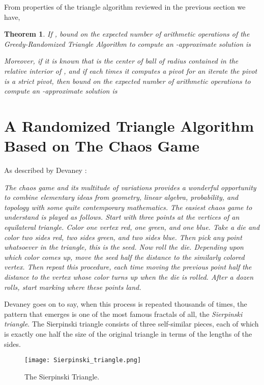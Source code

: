 \documentclass{article}
\newtheorem{thm}{Theorem}
\theoremstyle{definition}
\begin{document}
From properties of the triangle algorithm  reviewed  in the previous section we have,

\begin{thm} If , bound on the expected number of arithmetic operations of the Greedy-Randomized Triangle Algorithm to compute an -approximate solution is

Moreover, if it is known that  is the center of ball of radius  contained in the relative interior of , and if each times it computes a pivot for an iterate the pivot is a strict pivot, then bound on the expected number of arithmetic operations to compute an -approximate solution is

\end{thm}

\section{A Randomized Triangle Algorithm Based on The Chaos Game} \label{sec4}

As described by Devaney \cite{Devaney2004}:

{\it The {\it chaos game} and its multitude of variations provides a wonderful opportunity to combine elementary ideas from geometry, linear algebra, probability, and topology with some quite contemporary mathematics. The easiest chaos game to understand is played as follows. Start with three points at the vertices of an equilateral triangle. Color one vertex red, one green, and one blue. Take a die and color two sides red, two sides green, and two sides blue. Then pick any point whatsoever in the triangle, this is the seed. Now roll the die. Depending upon which color comes up, move the seed half the distance to the similarly colored vertex. Then repeat this procedure, each time moving the previous point half the distance to the vertex whose color turns up when the die is rolled. After a dozen rolls, start marking where these points land.}

Devaney goes on to say, when this process is  repeated  thousands of times, the pattern that emerges is one of the most famous fractals of all, the {\it Sierpinski triangle}. The Sierpinski triangle consists of three self-similar pieces, each of which is exactly one half the size of the original triangle in terms of the lengths of the sides.

\begin{figure}[h!]
\centering
\texttt{[image: Sierpinski\_triangle.png]}
\caption{The Sierpinski Triangle.} \label{Sier}
\end{figure}
\end{document}
